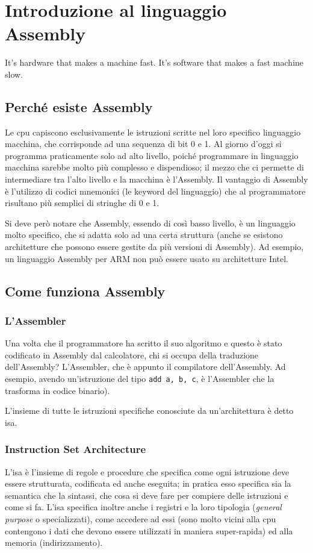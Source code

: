 \documentclass[class=book, crop=false, oneside]{standalone}
\begin{document}
\chapter{Introduzione al linguaggio Assembly}\begin{fquote}It's hardware that makes a machine fast. It's software that makes a fast machine slow.
 \end{fquote}

\section{Perché esiste Assembly}

Le \acrshort{cpu} capiscono esclusivamente le istruzioni scritte nel loro specifico linguaggio macchina, che corrisponde ad una sequenza di bit 0 e 1.
Al giorno d'oggi si programma praticamente solo ad alto livello, poiché programmare in linguaggio macchina sarebbe molto più complesso e dispendioso; il mezzo che ci permette di intermediare tra l'alto livello e la macchina è l’Assembly. Il vantaggio di Assembly è l'utilizzo di codici mnemonici (le keyword del linguaggio) che al programmatore risultano più semplici di stringhe di 0 e 1.

Si deve però notare che Assembly, essendo di così basso livello, è un linguaggio molto specifico, che si adatta solo ad una certa struttura (anche se esistono architetture che possono essere gestite da più versioni di Assembly). Ad esempio, un linguaggio Assembly per ARM non può essere usato su architetture Intel.

\section{Come funziona Assembly}

\subsection{L'Assembler}
Una volta che il programmatore ha scritto il suo algoritmo e questo è stato codificato in Assembly dal calcolatore, chi si occupa della traduzione dell'Assembly? L'Assembler, che è appunto il compilatore dell'Assembly. Ad esempio, avendo un'istruzione del tipo \texttt{add a, b, c}, è l'Assembler che la trasforma in codice binario).

L'insieme di tutte le istruzioni specifiche conosciute da un’architettura è detto \acrfull{isa}.

\subsection{Instruction Set Architecture}
L’\acrshort{isa} è l'insieme di regole e procedure che specifica come ogni istruzione deve essere strutturata, codificata ed anche eseguita; in pratica esso specifica sia la semantica che la sintassi, che cosa si deve fare per compiere delle istruzioni e come si fa. L'\acrshort{isa} specifica inoltre anche i registri e la loro tipologia (\emph{general purpose} o specializzati), come accedere ad essi (sono molto vicini alla \acrshort{cpu} contengono i dati che devono essere utilizzati in maniera super-rapida) ed alla memoria (indirizzamento).
\end{document}
